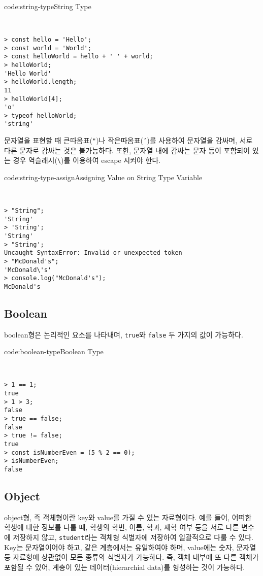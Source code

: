 \begin{codeenv}{code:string-type}{String Type}\begin{verbatim}


> const hello = 'Hello';
> const world = 'World';
> const helloWorld = hello + ' ' + world;
> helloWorld;
'Hello World'
> helloWorld.length;
11
> helloWorld[4];
'o'
> typeof helloWorld;
'string'
\end{verbatim}
\end{codeenv}

문자열을 표현할 때 큰따옴표(\texttt{"})나 작은따옴표(\texttt{'})를 사용하여 문자열을 감싸며, 서로 다른 문자로 감싸는 것은 불가능하다. 또한, 문자열 내에 감싸는 문자 등이 포함되어 있는 경우 역슬래시(\verb|\|)를 이용하여 escape 시켜야 한다.

\begin{codeenv}{code:string-type-assign}{Assigning Value on String Type Variable}\begin{verbatim}


> "String";
'String'
> 'String';
'String'
> "String';
Uncaught SyntaxError: Invalid or unexpected token
> "McDonald's";
'McDonald\'s'
> console.log("McDonald's");
McDonald's
\end{verbatim}
\end{codeenv}

\subsection*{Boolean}

boolean형은 논리적인 요소를 나타내며, \texttt{true}와 \texttt{false} 두 가지의 값이 가능하다.

\begin{codeenv}{code:boolean-type}{Boolean Type}\begin{verbatim}


> 1 == 1;
true
> 1 > 3;
false
> true == false;
false
> true != false;
true
> const isNumberEven = (5 % 2 == 0);
> isNumberEven;
false
\end{verbatim}
\end{codeenv}

\subsection*{Object}

object형, 즉 객체형이란 key와 value를 가질 수 있는 자료형이다. 예를 들어, 어떠한 학생에 대한 정보를 다룰 때, 학생의 학번, 이름, 학과, 재학 여부 등을 서로 다른 변수에 저장하지 않고, \texttt{student}라는 객체형 식별자에 저장하여 일괄적으로 다룰 수 있다. Key는 문자열이어야 하고, 같은 계층에서는 유일하여야 하며, value에는 숫자, 문자열 등 자료형에 상관없이 모든 종류의 식별자가 가능하다. 즉, 객체 내부에 또 다른 객체가 포함될 수 있어, 계층이 있는 데이터(hierarchial data)를 형성하는 것이 가능하다. 

